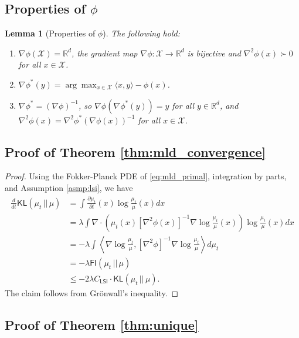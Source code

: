 \documentclass{article}
\newtheorem{lemma}[theorem]{Lemma}
\newcommand{\CLSI}[0]{C_{\mathsf{LSI}}}
\newcommand{\sep}[0]{\,||\,}
\newcommand{\KL}[0]{\mathsf{KL}}
\newcommand{\FI}[0]{\mathsf{FI}}
\begin{document}
\subsection{Properties of $\phi$}
\begin{lemma}[Properties of $\phi$]\label{lem:properties_of_phi}
The following hold:
\begin{enumerate}
    \item[(i)] $\nabla \phi(\mathcal{X})=\mathbb{R}^d$, the gradient map $\nabla\phi:\mathcal{X}\to\mathbb{R}^d$ is bijective and $\nabla^2\phi(x)\succ 0$ for all $x\in\mathcal{X}$.
    \item[(ii)] $\nabla\phi^*(y) = \arg\max_{x\in\mathcal{X}}\langle x,y\rangle-\phi(x)$.
    \item[(iii)]  $\nabla\phi^* = (\nabla\phi)^{-1}$, so $\nabla\phi(\nabla\phi^*(y)) = y$ for all $y\in\mathbb{R}^d$, and $\nabla^2\phi(x) =\nabla^2\phi^*(\nabla\phi(x))^{-1}$ for all $x\in\mathcal{X}$.
\end{enumerate}
\end{lemma}



\subsection{Proof of Theorem \ref{thm:mld_convergence}}\label{sec:b1}

\begin{proof}
Using the Fokker-Planck PDE of \eqref{eq:mld_primal}, integration by parts, and Assumption \ref{asmp:lsi}, we have \begin{align*}
        \frac{d}{dt}\KL(\mu_t\sep\mu) &= \int \frac{\partial\mu_t}{\partial t}(x)\log\frac{\mu_t}{\mu
        }(x)dx\\
        &= \lambda\int \nabla \cdot \left(\mu_t(x)[\nabla^2\phi(x)]^{-1}\nabla \log \frac{\mu_t}{\mu}(x)\right)\log \frac{\mu_t}{\mu}(x)dx\\
        &= -\lambda\int \left\langle \nabla \log \frac{\mu_t}{\mu}, [\nabla^2\phi]^{-1}\nabla\log \frac{\mu_t}{\mu}\right\rangle d\mu_t\\
        &= -\lambda  \FI(\mu_t\sep\mu)\\
        &\le -2\lambda\CLSI\cdot \KL(\mu_t\sep\mu).
    \end{align*}
    The claim follows from Gr\"onwall's inequality.    
\end{proof}

\subsection{Proof of Theorem \ref{thm:unique}}\label{app:proofunique}
\end{document}
